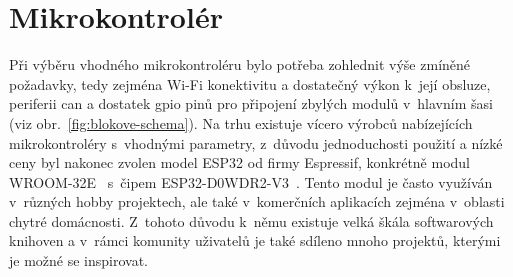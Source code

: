 \section{Mikrokontrolér}
Při výběru vhodného mikrokontroléru bylo potřeba zohlednit výše zmíněné požadavky, tedy zejména Wi-Fi konektivitu a dostatečný výkon k~její obsluze, periferii \acs{can} a dostatek \acs{gpio} pinů pro připojení zbylých modulů v~hlavním šasi (viz obr.~\ref{fig:blokove-schema}). Na trhu existuje vícero výrobců nabízejících mikrokontroléry s~vhodnými parametry, z~důvodu jednoduchosti použití a nízké ceny byl nakonec zvolen model ESP32 od firmy Espressif, konkrétně modul WROOM-32E~\cite{esp32-wroom-32e-datasheet} s~čipem ESP32-D0WDR2-V3~\cite{esp32-datasheet}. Tento modul je často využíván v~různých hobby projektech, ale také v~komerčních aplikacích zejména v~oblasti chytré domácnosti. Z~tohoto důvodu k~němu existuje velká škála softwarových knihoven a v~rámci komunity uživatelů je také sdíleno mnoho projektů, kterými je možné se inspirovat.
